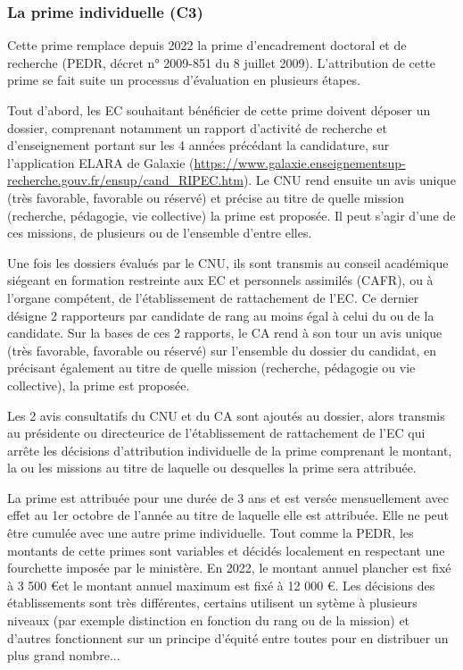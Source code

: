 \subsubsection{La prime individuelle (C3)}
\label{ripec-C3}

Cette prime remplace depuis 2022 la prime d'encadrement doctoral et de recherche (PEDR, d\'ecret n° 2009-851 du 8 juillet 2009). L'attribution de cette prime se fait suite un processus d'\'evaluation en plusieurs \'etapes.

Tout d'abord, les EC souhaitant b\'en\'eficier de cette prime doivent d\'eposer un dossier, comprenant notamment un rapport d'activit\'e de recherche et d'enseignement portant sur les 4 ann\'ees pr\'ec\'edant la candidature, sur l'application ELARA de Galaxie (\url{https://www.galaxie.enseignementsup-recherche.gouv.fr/ensup/cand_RIPEC.htm}). Le CNU rend ensuite un avis unique (tr\`es favorable, favorable ou r\'eserv\'e) et pr\'ecise au titre de quelle mission (recherche, p\'edagogie, vie collective) la prime est propos\'ee. Il peut s'agir d'une de ces missions, de plusieurs ou de l'ensemble d'entre elles.

Une fois les dossiers \'evalu\'es par le CNU, ils sont transmis au conseil acad\'emique si\'egeant en formation restreinte aux EC et personnels assimil\'es (CAFR), ou \`a l'organe comp\'etent, de l'\'etablissement de rattachement de l'EC. Ce dernier d\'esigne 2 rapporteurs par candidat\mp e de rang au moins \'egal \`a celui du ou de la candidat\mp e. Sur la bases de ces 2 rapports, le CA rend \`a son tour un avis unique (tr\`es favorable, favorable ou r\'eserv\'e) sur l’ensemble du dossier du candidat, en pr\'ecisant \'egalement au titre de quelle mission (recherche, p\'edagogie ou vie collective), la prime est propos\'ee.  

Les 2 avis consultatifs du CNU et du CA sont ajout\'es au dossier, alors transmis au pr\'esident\mp e ou directeur\mp ice de l'\'etablissement de rattachement de l'EC qui arr\^ete les d\'ecisions d’attribution individuelle de la prime comprenant le montant, la ou les missions au titre de laquelle ou desquelles la prime sera attribu\'ee.  

La prime est attribu\'ee pour une dur\'ee de 3 ans et est vers\'ee mensuellement avec effet au 1er octobre de l'ann\'ee au titre de laquelle elle est attribu\'ee. Elle ne peut être cumul\'ee avec une autre prime individuelle. Tout comme la PEDR, les montants de cette primes sont variables et d\'ecid\'es localement en respectant une fourchette impos\'ee par le minist\`ere. En 2022, le montant annuel plancher est fix\'e \`a 3 500 \euro et le montant annuel maximum est fix\'e \`a 12 000 \euro. Les d\'ecisions des \'etablissements sont tr\`es diff\'erentes, certains utilisent un syt\`eme \`a plusieurs niveaux (par exemple distinction en fonction du rang ou de la mission) et d'autres fonctionnent sur un principe d'\'equit\'e entre tou\mp te\mp s pour en distribuer un plus grand nombre...

